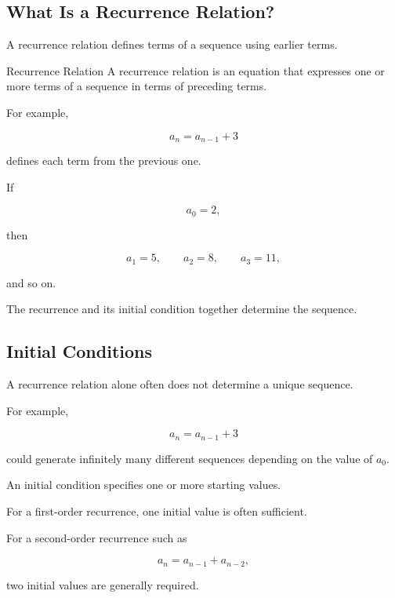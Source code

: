 \subsection{What Is a Recurrence Relation?}
\label{subsec:what-is-recurrence}

A recurrence relation defines terms of a sequence using earlier terms.

\begin{definitionbox}{Recurrence Relation}
A recurrence relation is an equation that expresses one or more terms
of a sequence in terms of preceding terms.
\end{definitionbox}

For example,

\[
a_n=a_{n-1}+3
\]

defines each term from the previous one.

If

\[
a_0=2,
\]

then

\[
a_1=5,
\qquad
a_2=8,
\qquad
a_3=11,
\]

and so on.

The recurrence and its initial condition together determine the
sequence.

\subsection{Initial Conditions}
\label{subsec:initial-conditions}

A recurrence relation alone often does not determine a unique sequence.

For example,

\[
a_n=a_{n-1}+3
\]

could generate infinitely many different sequences depending on the
value of \(a_0\).

An initial condition specifies one or more starting values.

For a first-order recurrence, one initial value is often sufficient.

For a second-order recurrence such as

\[
a_n=a_{n-1}+a_{n-2},
\]

two initial values are generally required.


